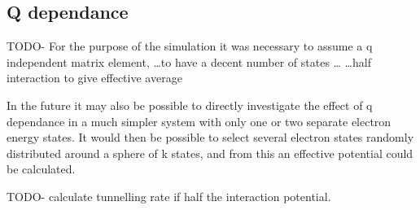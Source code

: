 \subsection{Q dependance}
TODO-
For the purpose of the simulation
it was necessary to assume a q independent
matrix element, \ldots to have a decent number of states \ldots
\ldots half interaction to give effective average

In the future it may also be possible to
directly investigate the effect
of q dependance in a much simpler system
with only one or two separate electron
energy states.
It would then be possible to select
several electron states randomly distributed
around a sphere of k states, and from
this an effective potential could be calculated.

TODO- calculate tunnelling rate if half the
interaction potential.